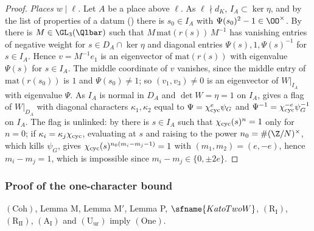 \begin{proof}
\emph{Places $w\mid\ell$.} Let $A$ be a place above $\ell$. As $\ell\nmid d_K$, $I_A\subset\ker\eta$, and by the list of properties
of a datum () there is $s_0\in I_A$ with $\Psi(s_0)^2-1\in\OO^\times$. By
 there is $M\in\GL_3(\Qlbar)$ such that $M\,\mathrm{mat}(r(s))\,M^{-1}$ has vanishing entries of
negative weight for $s\in D_A\cap\ker\eta$ and diagonal entries $\Psi(s),1,\Psi(s)^{-1}$ for $s\in I_A$. Hence $v=M^{-1}e_1$ is an
eigenvector of $\mathrm{mat}(r(s))$ with eigenvalue $\Psi(s)$ for $s\in I_A$. The middle coordinate of $v$ vanishes, since the middle
entry of $\mathrm{mat}(r(s_0))$ is $1$ and $\Psi(s_0)\ne1$; so $(v_1,v_3)\ne0$ is an eigenvector of $W|_{I_A}$ with eigenvalue $\Psi$.
As $I_A$ is normal in $D_A$ and $\det W=\eta=1$ on $I_A$, 
gives a flag of $W|_{D_A}$ with diagonal characters $\kappa_1,\kappa_2$ equal to $\Psi=\chi_{\mathrm{cyc}}^e\psi_G$ and $\Psi^{-1}=\chi_{\mathrm{cyc}}^{-e}\psi_G^{-1}$
on $I_A$. The flag is unlinked: by  there is $s\in I_A$ such that $\chi_{\mathrm{cyc}}(s)^n=1$ only for
$n=0$; if $\kappa_i=\kappa_j\chi_{\mathrm{cyc}}$, evaluating at $s$ and raising to the power $n_0=\#(\Z/N)^\times$, which kills $\psi_G$, gives
$\chi_{\mathrm{cyc}}(s)^{n_0(m_i-m_j-1)}=1$ with $(m_1,m_2)=(e,-e)$, hence $m_i-m_j=1$, which is impossible since $m_i-m_j\in\{0,\pm2e\}$.
\end{proof}

\subsubsection{Proof of the one-character bound}

\begin{theorem}\label{pf:eis:onecharthm}
$(\mathrm{Coh})$, Lemma M, Lemma M$'$, Lemma P, $\sfname{KatoTwoW}$, $(\mathrm{R}_{\mathrm{I}})$, $(\mathrm{R}_{\mathrm{II}})$, $(\mathrm{A}_{\mathrm{I}})$ and
$(\mathrm{U}_{\mathrm{ur}})$ imply $(\mathrm{One})$.
\end{theorem}

